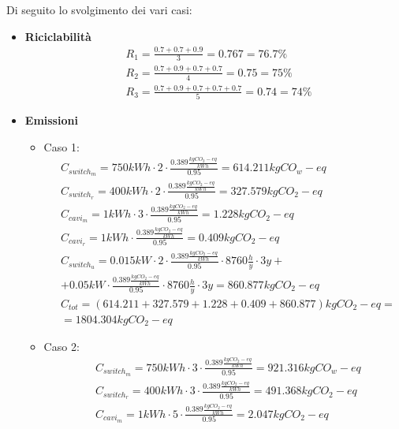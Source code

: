 Di seguito lo svolgimento dei vari casi:
\begin{itemize}
	\item \textbf{Riciclabilità}
	\begin{equation*}
		\begin{split}
			& R_1 = \frac{0.7 + 0.7 +0.9}{3} = 0.767 = 76.7\%\\
			& R_2 = \frac{0.7+0.9 + 0.7 + 0.7}{4} = 0.75 = 75\% \\
			& R_3 = \frac{0.7 + 0.9 + 0.7 + 0.7 + 0.7}{5} = 0.74 = 74\%
		\end{split}
	\end{equation*}
	\newpage
	\item \textbf{Emissioni}
	\begin{itemize}
		\item Caso 1:
		\begin{equation*}
			\begin{split}
				& C_{switch_m} = 750kWh \cdot 2 \cdot \frac{0.389 \frac{kg CO_2-eq}{kWh}}{0.95} = 614.211 kg CO_w-eq\\
				& C_{switch_r} = 400 kWh \cdot 2 \cdot \frac{0.389 \frac{kg CO_2-eq}{kWh}}{0.95} = 327.579 kg CO_2-eq \\
				& C_{cavi_m} = 1kWh \cdot 3 \cdot \frac{0.389 \frac{kg CO_2-eq}{kWh}}{0.95}  = 1.228 kg CO_2-eq\\
				& C_{cavi_r} = 1kWh \cdot \frac{0.389 \frac{kg CO_2-eq}{kWh}}{0.95} = 0.409 kg CO_2-eq \\
				& C_{switch_u} = 0.015kW \cdot 2 \cdot \frac{0.389 \frac{kg CO_2-eq}{kWh}}{0.95} \cdot 8760\frac{h}{y} \cdot3y +\\
				 & + 0.05kW \cdot \frac{0.389 \frac{kg CO_2-eq}{kWh}}{0.95} \cdot 8760\frac{h}{y} \cdot 3 y= 860.877 kg CO_2-eq \\
				& C_{tot} = (614.211 + 327.579 + 1.228 + 0.409 + 860.877)kg CO_2-eq = \\
				& = 1804.304 kg CO_2-eq
			\end{split}
		\end{equation*}
		\item Caso 2:
		\begin{equation*}
			\begin{split}
				& C_{switch_m} = 750kWh \cdot 3 \cdot \frac{0.389 \frac{kg CO_2-eq}{kWh}}{0.95} = 921.316 kg CO_w-eq\\
				& C_{switch_r} = 400 kWh \cdot 3 \cdot \frac{0.389 \frac{kg CO_2-eq}{kWh}}{0.95} = 491.368 kg CO_2-eq \\
				& C_{cavi_m} = 1kWh \cdot 5 \cdot \frac{0.389 \frac{kg CO_2-eq}{kWh}}{0.95}  = 2.047 kg CO_2-eq\\

\end{split}
\end{equation*}
\end{itemize}
\end{itemize}
